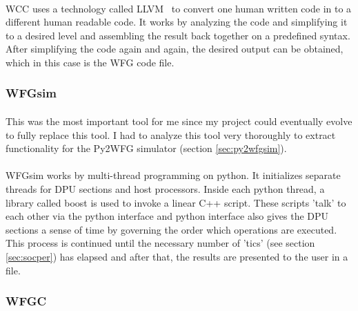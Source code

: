 \paragraph{}
WCC uses a technology called LLVM~\cite{LLVM} to convert one human written code in to a different human readable code. It works by analyzing the code and simplifying it to a desired level and assembling the result back together on a predefined syntax. After simplifying the code again and again, the desired output can be obtained, which in this case is the WFG code file.

\subsubsection{WFGsim}
\label{sec:wfgsim}
\paragraph{}
This was the most important tool for me since my project could eventually evolve to fully replace this tool. I had to analyze this tool very thoroughly to extract functionality for the Py2WFG simulator (section \ref{sec:py2wfgsim}). 

\paragraph{}
WFGsim works by multi-thread programming on python. It initializes separate threads for DPU sections and host processors. Inside each python thread, a library called boost is used to invoke a linear C++ script. These scripts 'talk' to each other via the python interface and python interface also gives the DPU sections a sense of time by governing the order which operations are executed. This process is continued until the necessary number of 'tics' (see section \ref{sec:socper}) has elapsed and after that, the results are presented to the user in a file.

\subsubsection{WFGC}

